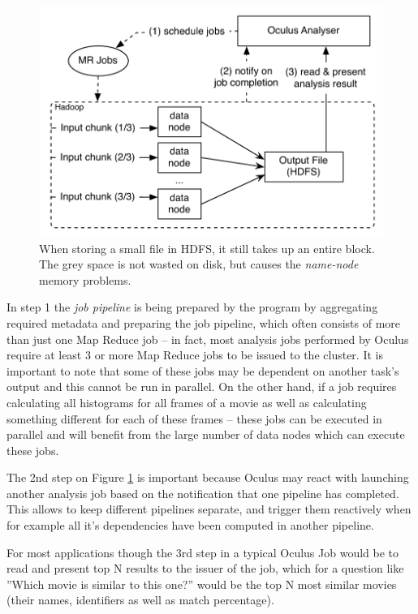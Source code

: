 \begin{figure}[ch!]
  \centering
  \includegraphics[scale=0.9]{diagrams/analyser-high-level.pdf}
  \caption{When storing a small file in HDFS, it still takes up an entire block. The grey space is not wasted on disk, but causes the \textit{name-node} memory problems.}
  \label{fig:analyser-high-level}
\end{figure}

In step 1 the \textit{job pipeline} is being prepared by the program by aggregating required metadata and preparing the job pipeline, which often consists of more than just one Map Reduce job -- in fact, most analysis jobs performed by Oculus require at least 3 or more Map Reduce jobs to be issued to the cluster. It is important to note that some of these jobs may be dependent on another task's output and this cannot be run in parallel. On the other hand, if a job requires calculating all histograms for all frames of a movie as well as calculating something different for each of these frames -- these jobs can be executed in parallel and will benefit from the large number of data nodes which can execute these jobs.

The 2nd step on Figure \ref{fig:analyser-high-level} is important because Oculus may react with launching another analysis job based on the notification that one pipeline has completed. This allows to keep different pipelines separate, and trigger them reactively when for example all it's dependencies have been computed in another pipeline.

For most applications though the 3rd step in a typical Oculus Job would be to read and present top N results to the issuer of the job, which for a question like ''Which movie is similar to this one?'' would be the top N most similar movies (their names, identifiers as well as match percentage).


